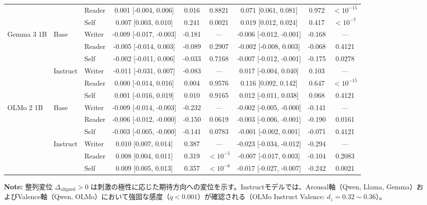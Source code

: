 \begin{table}[htbp]
\begin{tabular}{lll ccc ccc}
                       &                      & Reader     & 0.001 [-0.004, 0.006] & 0.016 & 0.8821 & 0.071 [0.061, 0.081] & 0.972 & $<10^{-15}$ \\
                       &                      & Self       & 0.007 [0.003, 0.010] & 0.241 & 0.0021 & 0.019 [0.012, 0.024] & 0.417 & $<10^{-7}$ \\
\midrule
\multirow{6}{*}{Gemma 3 1B} & \multirow{3}{*}{Base} & Writer     & -0.009 [-0.017, -0.003] & -0.181 & --- & -0.006 [-0.012, -0.001] & -0.168 & --- \\
                       &                      & Reader     & -0.005 [-0.014, 0.003] & -0.089 & 0.2907 & -0.002 [-0.008, 0.003] & -0.068 & 0.4121 \\
                       &                      & Self       & -0.002 [-0.011, 0.006] & -0.033 & 0.7168 & -0.007 [-0.012, -0.001] & -0.175 & 0.0278 \\
\cmidrule(lr){2-9}
                       & \multirow{3}{*}{Instruct} & Writer     & -0.011 [-0.031, 0.007] & -0.083 & --- & 0.017 [-0.004, 0.040] & 0.103 & --- \\
                       &                      & Reader     & 0.000 [-0.014, 0.016] & 0.004 & 0.9576 & 0.116 [0.092, 0.142] & 0.647 & $<10^{-15}$ \\
                       &                      & Self       & 0.001 [-0.016, 0.019] & 0.010 & 0.9165 & 0.012 [-0.011, 0.038] & 0.068 & 0.4121 \\
\midrule
\multirow{6}{*}{OLMo 2 1B} & \multirow{3}{*}{Base} & Writer     & -0.009 [-0.014, -0.003] & -0.232 & --- & -0.002 [-0.005, -0.000] & -0.141 & --- \\
                       &                      & Reader     & -0.006 [-0.012, -0.000] & -0.150 & 0.0619 & -0.003 [-0.006, -0.001] & -0.190 & 0.0161 \\
                       &                      & Self       & -0.003 [-0.005, -0.000] & -0.141 & 0.0783 & -0.001 [-0.002, 0.001] & -0.071 & 0.4121 \\
\cmidrule(lr){2-9}
                       & \multirow{3}{*}{Instruct} & Writer     & 0.010 [0.007, 0.014] & 0.387 & --- & -0.023 [-0.034, -0.012] & -0.294 & --- \\
                       &                      & Reader     & 0.008 [0.004, 0.011] & 0.319 & $<10^{-5}$ & -0.007 [-0.017, 0.003] & -0.104 & 0.2083 \\
                       &                      & Self       & 0.009 [0.005, 0.013] & 0.357 & $<10^{-6}$ & -0.017 [-0.027, -0.007] & -0.242 & 0.0021 \\
\bottomrule
\end{tabular}
\vspace{1ex}
\begin{minipage}{\linewidth}
\footnotesize
\textbf{Note:} 整列変位 $\Delta_{\text{aligned}} > 0$ は刺激の極性に応じた期待方向への変位を示す。Instructモデルでは、Arousal軸（Qwen, Llama, Gemma）およびValence軸（Qwen, OLMo）において強固な感度（$q < 0.001$）が確認される（OLMo Instruct Valence: $d_z = 0.32 \sim 0.36$）。
\end{minipage}
\end{table}